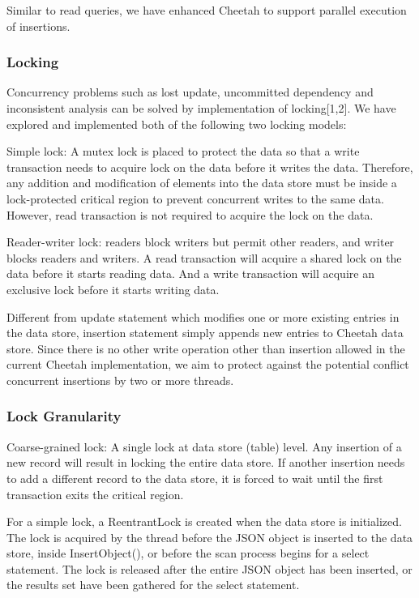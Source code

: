 \documentclass[11pt,journal,compsoc]{IEEEtran}
\begin{document}
Similar to read queries, we have enhanced Cheetah to support parallel execution of insertions.



\subsubsection{Locking}
Concurrency problems such as lost update, uncommitted dependency and inconsistent analysis can be solved by implementation of locking[1,2]. We have explored and implemented both of the following two locking models:
 
Simple lock: A mutex lock is placed to protect the data so that a write transaction needs to acquire lock on the data before it writes the data. Therefore, any addition and modification of elements into the data store must be inside a lock-protected critical region to prevent concurrent writes to the same data. However, read transaction is not required to acquire the lock on the data.
 
Reader-writer lock: readers block writers but permit other readers, and writer blocks readers and writers. A read transaction will acquire a shared lock on the data before it starts reading data. And a write transaction will acquire an exclusive lock before it starts writing data.
 
Different from update statement which modifies one or more existing entries in the data store, insertion statement simply appends new entries to Cheetah data store. Since there is no other write operation other than insertion allowed in the current Cheetah implementation, we aim to protect against the potential conflict concurrent insertions by two or more threads.

\subsubsection{Lock Granularity}
Coarse-grained lock: A single lock at data store (table) level. Any insertion of a new record will result in locking the entire data store. If another insertion needs to add a different record to the data store, it is forced to wait until the first transaction exits the critical region.
 
For a simple lock, a ReentrantLock is created when the data store is initialized. The lock is acquired by the thread before the JSON object is inserted to the data store, inside InsertObject(), or before the scan process begins for a select statement.  The lock is released after the entire JSON object has been inserted, or the results set have been gathered for the select statement.
\end{document}
